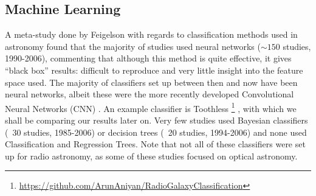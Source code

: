 \documentclass[conference]{IEEEtran}
\begin{document}
\subsection{Machine Learning}
A meta-study done by Feigelson \cite{feigelson} with regards to classification 
methods used in astronomy found that the majority of studies used neural networks
($\sim150$ studies, 1990-2006), commenting that although this method is quite effective, 
it gives ``black box'' results: difficult to reproduce and very little insight into 
the feature space used. The majority of classifiers set up between then and now 
have been neural networks, albeit these were the more recently developed 
Convolutional Neural Networks (CNN) \cite{hinton_2012}. An example classifier is Toothless \footnote{\url{https://github.com/ArunAniyan/RadioGalaxyClassification}}  \cite{aniyan_thorat_2017}, with which we shall be comparing our results later on. Very few studies used 
Bayesian classifiers (~30 studies, 1985-2006) or decision trees (~20 studies, 
1994-2006) and none used Classification and Regression Trees. Note that not all of these classifiers were set up for radio astronomy, as some of these studies focused on optical astronomy.





\end{document}
